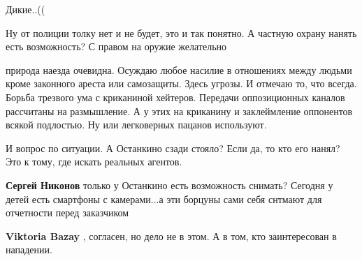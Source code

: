 \begin{itemize}
Дикие..((

 
Ну от полиции толку нет и не будет, это и так понятно. А частную охрану нанять есть возможность? С правом на оружие желательно

 

природа наезда очевидна. Осуждаю любое насилие в отношениях между людьми кроме
законного ареста или самозащиты. Здесь угрозы. И отмечаю то, что всегда. Борьба
трезвого ума с криканиной хейтеров. Передачи оппозиционных каналов рассчитаны
на размышление. А у этих на криканину и заклеймление оппонентов всякой
подлостью. Ну или легковерных пацанов используют.


 

И вопрос по ситуации. А Останкино сзади стояло? Если да, то кто его нанял? Это
к тому, где искать реальных агентов.

\begin{itemize}
 
\textbf{Сергей Никонов} только у Останкино есть возможность снимать? Сегодня у детей есть смартфоны с камерами...а эти борцуны сами себя снтмают для отчетности перед заказчиком

 
\textbf{Viktoria Bazay} , согласен, но дело не в этом. А в том, кто заинтересован в нападении.


\end{itemize}
\end{itemize}
